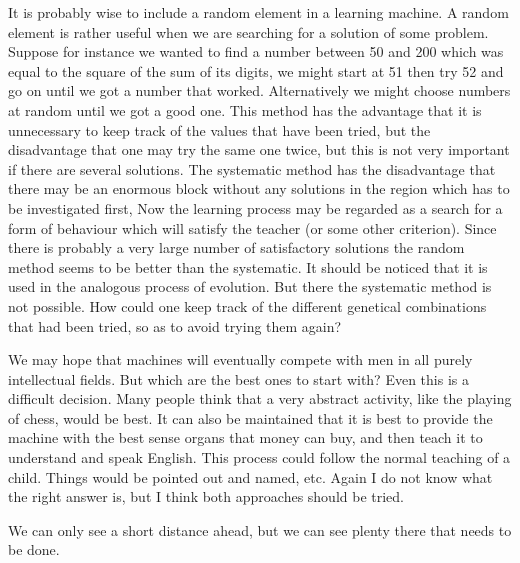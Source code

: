 \documentclass[10pt]{article} %
\begin{document}
It is probably wise to include a random element in a learning machine. A random element is rather useful when we are searching for a solution of some problem. Suppose for instance we wanted to find a number between 50 and 200 which was equal to the square of the sum of its digits, we might start at 51 then try 52 and go on until we got a number that worked. Alternatively we might choose numbers at random until we got a good one. This method has the advantage that it is unnecessary to keep track of the values that have been tried, but the disadvantage that one may try the same one twice, but this is not very important if there are several solutions. The systematic method has the disadvantage that there may be an enormous block without any solutions in the region which has to be investigated first, Now the learning process may be regarded as a search for a form of behaviour which will satisfy the teacher (or some other criterion). Since there is probably a very large number of satisfactory solutions the random method seems to be better than the systematic. It should be noticed that it is used in the analogous process of evolution. But there the systematic method is not possible. How could one keep track of the different genetical combinations that had been tried, so as to avoid trying them again?

We may hope that machines will eventually compete with men in all purely intellectual fields. But which are the best ones to start with? Even this is a difficult decision. Many people think that a very abstract activity, like the playing of chess, would be best. It can also be maintained that it is best to provide the machine with the best sense organs that money can buy, and then teach it to understand and speak English. This process could follow the normal teaching of a child. Things would be pointed out and named, etc. Again I do not know what the right answer is, but I think both approaches should be tried.

We can only see a short distance ahead, but we can see plenty there that needs to be done.
\end{document}

